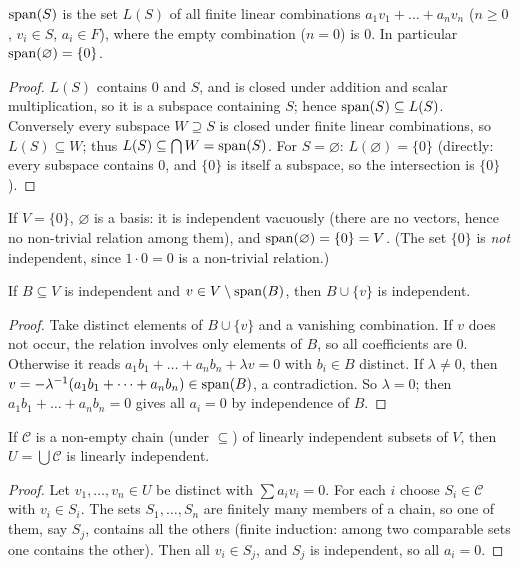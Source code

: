 \begin{lemma}\label{lem:span}
	$\operatorname{span}(S)$ is the set $L(S)$ of all finite linear combinations $a_1v_1+\dots+a_nv_n$ ($n\ge0$, $v_i\in S$, $a_i\in F$), where the empty combination ($n=0$) is $0$. In particular $\operatorname{span}(\varnothing)=\{0\}$.
\end{lemma}
\begin{proof}
	$L(S)$ contains $0$ and $S$, and is closed under addition and scalar multiplication, so it is a subspace containing $S$; hence $\operatorname{span}(S)\subseteq L(S)$. Conversely every subspace $W\supseteq S$ is closed under finite linear combinations, so $L(S)\subseteq W$; thus $L(S)\subseteq\bigcap W=\operatorname{span}(S)$. For $S=\varnothing$: $L(\varnothing)=\{0\}$ (directly: every subspace contains $0$, and $\{0\}$ is itself a subspace, so the intersection is $\{0\}$).
\end{proof}

\begin{example}
	If $V=\{0\}$, $\varnothing$ is a basis: it is independent vacuously (there are no vectors, hence no non-trivial relation among them), and $\operatorname{span}(\varnothing)=\{0\}=V$. (The set $\{0\}$ is \emph{not} independent, since $1\cdot0=0$ is a non-trivial relation.)
\end{example}

\begin{lemma}\label{lem:extend}
	If $B\subseteq V$ is independent and $v\in V\setminus\operatorname{span}(B)$, then $B\cup\{v\}$ is independent.
\end{lemma}
\begin{proof}
	Take distinct elements of $B\cup\{v\}$ and a vanishing combination. If $v$ does not occur, the relation involves only elements of $B$, so all coefficients are $0$. Otherwise it reads $a_1b_1+\dots+a_nb_n+\lambda v=0$ with $b_i\in B$ distinct. If $\lambda\neq0$, then $v=-\lambda^{-1}(a_1b_1+\dots+a_nb_n)\in\operatorname{span}(B)$, a contradiction. So $\lambda=0$; then $a_1b_1+\dots+a_nb_n=0$ gives all $a_i=0$ by independence of $B$.
\end{proof}

\begin{lemma}\label{lem:chainunion}
	If $\mathcal C$ is a non-empty chain (under $\subseteq$) of linearly independent subsets of $V$, then $U=\bigcup\mathcal C$ is linearly independent.
\end{lemma}
\begin{proof}
	Let $v_1,\dots,v_n\in U$ be distinct with $\sum a_iv_i=0$. For each $i$ choose $S_i\in\mathcal C$ with $v_i\in S_i$. The sets $S_1,\dots,S_n$ are finitely many members of a chain, so one of them, say $S_j$, contains all the others (finite induction: among two comparable sets one contains the other). Then all $v_i\in S_j$, and $S_j$ is independent, so all $a_i=0$.
\end{proof}

